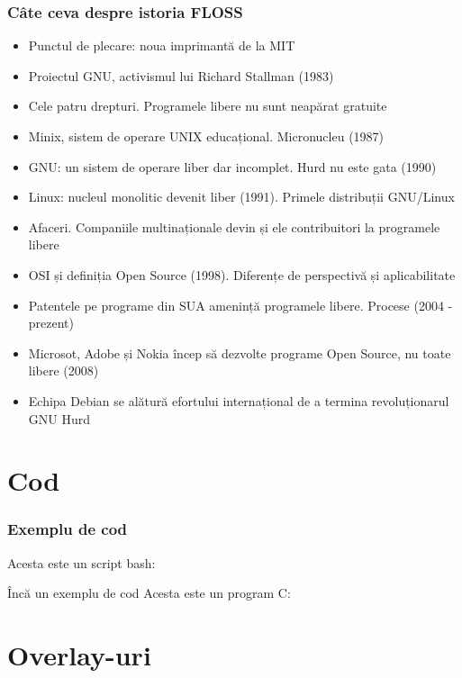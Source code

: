 \documentclass{beamer}
\begin{document}
\begin{frame}[allowframebreaks] %
  \frametitle{Câte ceva despre istoria FLOSS}
  \begin{itemize}
  \item Punctul de plecare: noua imprimantă de la MIT
  \item Proiectul GNU, activismul lui Richard Stallman (1983)
  \item Cele patru drepturi. Programele libere nu sunt neapărat gratuite
  \item Minix, sistem de operare UNIX educațional. Micronucleu (1987)
  \item GNU: un sistem de operare liber dar incomplet. Hurd nu este gata (1990)
  \item Linux: nucleul monolitic devenit liber (1991). Primele distribuții
    GNU/Linux
  \item Afaceri. Companiile multinaționale devin și ele contribuitori la
    programele libere
  \item OSI și definiția Open Source (1998). Diferențe de perspectivă și
    aplicabilitate
  \item Patentele pe programe din SUA amenință programele libere. Procese (2004
    - prezent)
  \item Microsot, Adobe și Nokia încep să dezvolte programe Open Source, nu
    toate libere (2008)
  \item Echipa Debian se alătură efortului internațional de a termina
    revoluționarul GNU Hurd
  \end{itemize}
\end{frame}

\section{Cod}
\frame{\tableofcontents[currentsection]}

\begin{frame}
  \frametitle{Exemplu de cod}
  Acesta este un script bash:\\
\end{frame}

\begin{frame}{Încă un exemplu de cod}
  Acesta este un program C:

  
\end{frame}

\section{Overlay-uri}
\frame{\tableofcontents[currentsection]}
\end{document}

